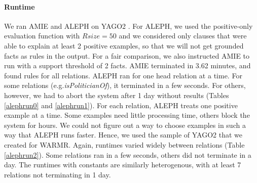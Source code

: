 \paragraph{Runtime} 
We ran AMIE and ALEPH on YAGO2 \cite{yago2}. For ALEPH, we used the positive-only evaluation function with $Rsize=50$ and we considered only clauses that were able to explain at least 2 positive examples, 
so that we will not get grounded facts as rules in the output. 
For a fair comparison, we also instructed AMIE to run with a support threshold of 2 facts.
AMIE terminated in 3.62 minutes, and found rules for all relations. ALEPH ran for one head relation at a time. For some relations (e.g.\emph{isPoliticianOf}), it terminated in a few seconds. 
For others, however, we had to abort the system after 1 day without results (Tables \ref{alephrun0} and \ref{alephrun1}). 
For each relation, ALEPH treats one positive example at a time. Some examples need little processing time, others block the system for hours. 
We could not figure out a way to choose examples in such a way that ALEPH runs faster. 
Hence, we used the sample of YAGO2 that we created for WARMR.
Again, runtimes varied widely between relations (Table \ref{alephrun2}). 
Some relations ran in a few seconds, others did not terminate in a day. 
The runtimes with constants are similarly heterogenous, with at least 7 relations not terminating in 1 day.

